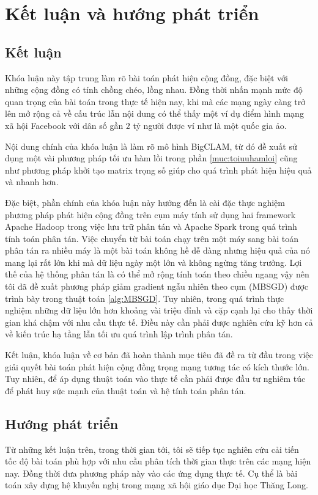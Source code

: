\def\baselinestretch{1}
\chapter{Kết luận và hướng phát triển}
\ifpdf
    \graphicspath{{Conclusions/ConclusionsFigs/PNG/}{Conclusions/ConclusionsFigs/PDF/}{Conclusions/ConclusionsFigs/}}
\else
    \graphicspath{{Conclusions/ConclusionsFigs/EPS/}{Conclusions/ConclusionsFigs/}}
\fi

\def\baselinestretch{1.66}

\section{Kết luận}
Khóa luận này tập trung làm rõ bài toán phát hiện cộng đồng, đặc biệt với những cộng đồng có tính chồng chéo, lồng nhau. Đồng thời nhấn mạnh mức độ quan trọng của bài toán trong thực tế hiện nay, khi mà các mạng ngày càng trở lên mở rộng cả về cấu trúc lẫn nội dung có thể thấy một ví dụ điểm hình mạng xã hội Facebook với dân số gần $2$ tỷ người được ví như là một quốc gia ảo. 

Nội dung chính của khóa luận là làm rõ mô hình BigCLAM, từ đó đề xuất sử dụng một vài phương pháp tối ưu hàm lồi trong phần \ref{muc:toiuuhamloi} cũng như phương pháp khởi tạo matrix trọng số giúp cho quá trình phát hiện hiệu quả và nhanh hơn.

Đặc biệt, phần chính của khóa luận này hướng đến là cài đặc thực nghiệm phương pháp phát hiện cộng đồng trên cụm máy tính sử dụng hai framework Apache Hadoop trong việc lưu trữ phân tán và Apache Spark trong quá trình tính toán phân tán. Việc chuyển từ bài toán chạy trên một máy sang bài toán phân tán ra nhiều máy là một bài toán không hề dễ dàng nhưng hiệu quả của nó mang lại rất lớn khi mà dữ liệu ngày một lớn và không ngừng tăng trưởng. Lợi thế của hệ thống phân tán là có thể mở rộng tính toán theo chiều ngang vậy nên tôi đã đề xuất phương pháp giảm gradient ngẫu nhiên theo cụm (MBSGD) được trình bày trong thuật toán \ref{alg:MBSGD}. Tuy nhiên, trong quá trình thực nghiệm những dữ liệu lớn hơn khoảng vài triệu đỉnh và cặp cạnh lại cho thấy thời gian khá chậm với nhu cầu thực tế. Điều này cần phải được nghiên cứu kỹ hơn cả về kiến trúc hạ tầng lẫn tối ưu quá trình lập trình phân tán.

Kết luận, khóa luận về cơ bản đã hoàn thành mục tiêu đã đề ra từ đầu trong việc giải quyết bài toán phát hiện cộng đồng trọng mạng tương tác có kích thước lớn. Tuy nhiên, để áp dụng thuật toán vào thực tế cần phải được đầu tư nghiêm túc để phát huy sức mạnh của thuật toán và hệ tính toán phân tán.

\section{Hướng phát triển}
Từ những kết luận trên, trong thời gian tới, tôi sẽ tiếp tục nghiên cứu cải tiến tốc độ bài toán phù hợp với nhu cầu phân tích thời gian thực trên các mạng hiện nay. Đồng thời đưa phương pháp này vào các ứng dụng thực tế. Cụ thể là bài toán xây dựng hệ khuyến nghị trong mạng xã hội giáo dục Đại học Thăng Long.